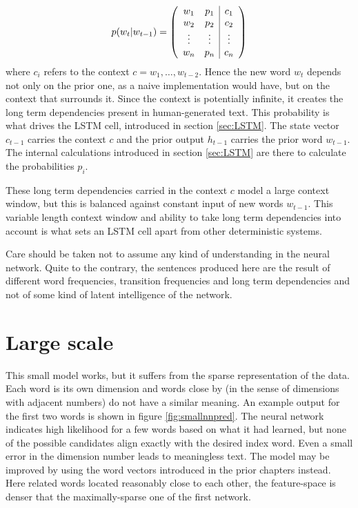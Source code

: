 \documentclass[10pt, a4paper]{UUThesisTemplate}
\begin{document}
\begin{align}
p(w_{t}|w_{t-1}) = \left(\begin{array}{c c | c} w_1 & p_1 & c_1\\ w_2 & p_2 & c_2\\\vdots & \vdots & \vdots\\w_n & p_n & c_n\end{array}\right)
\end{align}
where $c_i$ refers to the context $c = w_1, \ldots, w_{t-2}$. Hence the new word $w_t$ depends not only on the prior one, as a naive implementation would have, but on the context that surrounds it. Since the context is potentially infinite, it creates the long term dependencies present in human-generated text. This probability is what drives the LSTM cell, introduced in section \ref{sec:LSTM}. The state vector $c_{t-1}$ carries the context $c$ and the prior output $h_{t-1}$ carries the prior word $w_{t-1}$. The internal calculations introduced in section \ref{sec:LSTM} are there to calculate the probabilities $p_i$.

These long term dependencies carried in the context $c$ model a large context window, but this is balanced against constant input of new words $w_{t-1}$. This variable length context window and ability to take long term dependencies into account is what sets an LSTM cell apart from other deterministic systems.

Care should be taken not to assume any kind of understanding in the neural network. Quite to the contrary, the sentences produced here are the result of different word frequencies, transition frequencies and long term dependencies and not of some kind of latent intelligence of the network.

\section{Large scale}

This small model works, but it suffers from the sparse representation of the data. Each word is its own dimension and words close by (in the sense of dimensions with adjacent numbers) do not have a similar meaning. An example output for the first two words is shown in figure \ref{fig:smallnnpred}. The neural network indicates high likelihood for a few words based on what it had learned, but none of the possible candidates align exactly with the desired index word. Even a small error in the dimension number leads to meaningless text. The model may be improved by using the word vectors introduced in the prior chapters instead. Here related words located reasonably close to each other, the feature-space is denser that the maximally-sparse one of the first network.
\end{document}
